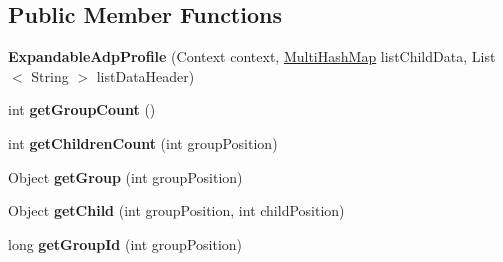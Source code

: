 \subsection*{Public Member Functions}
\begin{DoxyCompactItemize}
\item 
{\bfseries Expandable\+Adp\+Profile} (Context context, \hyperlink{classcom_1_1example_1_1sebastian_1_1tindertp_1_1commonTools_1_1MultiHashMap}{Multi\+Hash\+Map} list\+Child\+Data, List$<$ String $>$ list\+Data\+Header)\hypertarget{classcom_1_1example_1_1sebastian_1_1tindertp_1_1ExpandableAdpProfile_a11bbf7467f3bb8340efc07443aecc8a0}{}\label{classcom_1_1example_1_1sebastian_1_1tindertp_1_1ExpandableAdpProfile_a11bbf7467f3bb8340efc07443aecc8a0}

\item 
int {\bfseries get\+Group\+Count} ()\hypertarget{classcom_1_1example_1_1sebastian_1_1tindertp_1_1ExpandableAdpProfile_abe032074dc366ad2878f4030090b81b9}{}\label{classcom_1_1example_1_1sebastian_1_1tindertp_1_1ExpandableAdpProfile_abe032074dc366ad2878f4030090b81b9}

\item 
int {\bfseries get\+Children\+Count} (int group\+Position)\hypertarget{classcom_1_1example_1_1sebastian_1_1tindertp_1_1ExpandableAdpProfile_a8ed6d89b5f2b76f9f72a84cec759342d}{}\label{classcom_1_1example_1_1sebastian_1_1tindertp_1_1ExpandableAdpProfile_a8ed6d89b5f2b76f9f72a84cec759342d}

\item 
Object {\bfseries get\+Group} (int group\+Position)\hypertarget{classcom_1_1example_1_1sebastian_1_1tindertp_1_1ExpandableAdpProfile_a84ba79febdce26bd6820e755f61714ee}{}\label{classcom_1_1example_1_1sebastian_1_1tindertp_1_1ExpandableAdpProfile_a84ba79febdce26bd6820e755f61714ee}

\item 
Object {\bfseries get\+Child} (int group\+Position, int child\+Position)\hypertarget{classcom_1_1example_1_1sebastian_1_1tindertp_1_1ExpandableAdpProfile_a62cd1d9e53dd38c77e56b7cd8faeb746}{}\label{classcom_1_1example_1_1sebastian_1_1tindertp_1_1ExpandableAdpProfile_a62cd1d9e53dd38c77e56b7cd8faeb746}

\item 
long {\bfseries get\+Group\+Id} (int group\+Position)\hypertarget{classcom_1_1example_1_1sebastian_1_1tindertp_1_1ExpandableAdpProfile_a05816e2367476e158608d9d9b8312206}{}\label{classcom_1_1example_1_1sebastian_1_1tindertp_1_1ExpandableAdpProfile_a05816e2367476e158608d9d9b8312206}


\end{DoxyCompactItemize}
